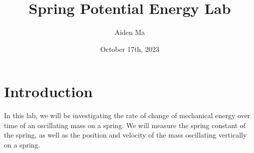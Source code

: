 \documentclass[titlepage]{article}
\title{Spring Potential Energy Lab}
\author{Aiden Ma}
\date{October 17th, 2023}
\begin{document}
    
    \maketitle
    
    \tableofcontents
    
    \newpage
    
    
    \section{Introduction}\label{sec:introduction}
        In this lab, we will be investigating the rate of change of mechanical energy over time of an oscillating mass on a spring.
        We will measure the spring constant of the spring, as well as the position and velocity of the mass oscillating vertically on a spring.
    
    
\end{document}
